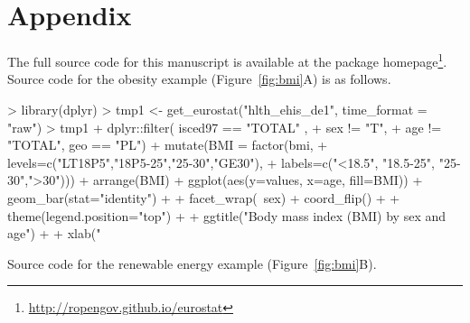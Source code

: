 \address{Przemys{\l}aw Biecek\\
  Faculty of Mathematics and Information Science\\
  Warsaw University of Technology\\
  Koszykowa 75, 00-662 Warsaw\\
  Poland\\}

\newpage

\section{Appendix}

The full source code for this manuscript is available at the package homepage\footnote{\url{http://ropengov.github.io/eurostat}}. Source code for the obesity example (Figure~\ref{fig:bmi}A) is as follows.

\begin{example}
> library(dplyr)
> tmp1 <- get_eurostat("hlth_ehis_de1", time_format = "raw")
> tmp1 %
+  dplyr::filter( isced97 == "TOTAL" ,
+          sex != "T",
+          age != "TOTAL", geo == "PL") %
+  mutate(BMI = factor(bmi, 
+                      levels=c("LT18P5","18P5-25","25-30","GE30"), 
+                      labels=c("<18.5", "18.5-25", "25-30",">30"))) %
+  arrange(BMI) %
+  ggplot(aes(y=values, x=age, fill=BMI)) + geom_bar(stat="identity") +
+  facet_wrap(~sex) + coord_flip() +
+  theme(legend.position="top") +
+  ggtitle("Body mass index (BMI) by sex and age") +
+  xlab("%
\end{example}


Source code for the renewable energy example (Figure~\ref{fig:bmi}B).

